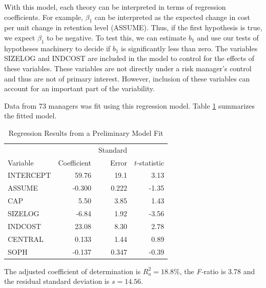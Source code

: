 With this model, each theory can be interpreted in terms of
regression coefficients. For example, $\beta_1 $ can be interpreted
as the expected change in cost per unit change in retention level
(ASSUME). Thus, if the first hypothesis is true, we expect $\beta_1
$ to be negative. To test this, we can estimate $b_{1}$ and use our
tests of hypotheses machinery to decide if $b_{1}$ is significantly
less than zero. The variables SIZELOG and INDCOST are included in
the model to control for the effects of these variables. These
variables are not directly under a risk manager's control and thus
are not of primary interest. However, inclusion of these variables
can account for an important part of the variability.

Data from 73 managers was fit using this regression model. Table
\ref{T6:FirmRiskPrelim} summarizes the fitted model.

\begin{table}[h]
 \caption{\label{T6:FirmRiskPrelim} Regression
Results from a Preliminary Model Fit}
\begin{tabular}{l|rrr}
\hline
 &  & Standard &  \\
Variable & Coefficient & Error & $t$-statistic \\
\hline
INTERCEPT & 59.76 & 19.1 & 3.13 \\
ASSUME & -0.300 & 0.222 & -1.35 \\
CAP & 5.50 & 3.85 & 1.43 \\
SIZELOG & -6.84 & 1.92 & -3.56 \\
INDCOST & 23.08 & 8.30 & 2.78 \\
CENTRAL & 0.133 & 1.44 & 0.89 \\
SOPH & -0.137 & 0.347 & -0.39 \\
\hline
\end{tabular}
  \end{table}


\noindent The adjusted coefficient of determination is $R_{a}^{2}=18.8\%$, the \textit{%
F-}ratio is 3.78 and the residual standard deviation is $s=14.56$.

